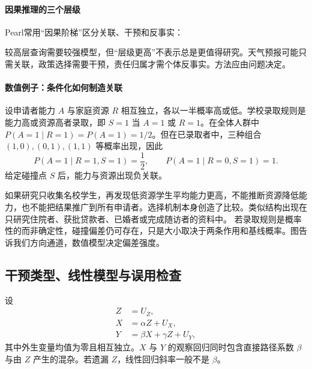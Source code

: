 \paragraph{因果推理的三个层级}

Pearl常用“因果阶梯”区分关联、干预和反事实\parencite{pearlMackenzie2018}：

\begin{center}
\end{center}

较高层查询需要较强模型，但“层级更高”不表示总是更值得研究。天气预报可能只需关联，政策选择需要干预，责任归属才需个体反事实。方法应由问题决定。

\paragraph{数值例子：条件化如何制造关联}

设申请者能力 $A$ 与家庭资源 $R$ 相互独立，各以一半概率高或低。学校录取规则是能力高或资源高者录取，即 $S=1$ 当 $A=1$ 或 $R=1$。在全体人群中 $P(A=1\mid R=1)=P(A=1)=1/2$。但在已录取者中，三种组合 $(1,0),(0,1),(1,1)$ 等概率出现，因此
\[
P(A=1\mid R=1,S=1)=\frac12,
\qquad
P(A=1\mid R=0,S=1)=1.
\]
给定碰撞点 $S$ 后，能力与资源出现负关联。

如果研究只收集名校学生，再发现低资源学生平均能力更高，不能推断资源降低能力，也不能把结果推广到所有申请者。选择机制本身创造了比较。类似结构出现在只研究住院者、获批贷款者、已婚者或完成随访者的资料中。
若录取规则是概率性的而非确定性，碰撞偏差仍可存在，只是大小取决于两条作用和基线概率。图告诉我们方向通道，数值模型决定偏差强度。

\subsection{干预类型、线性模型与误用检查}

设
\begin{align*}
Z&=U_Z,\\
X&=\alpha Z+U_X,\\
Y&=\beta X+\gamma Z+U_Y,
\end{align*}
其中外生变量均值为零且相互独立。$X$ 与 $Y$ 的观察回归同时包含直接路径系数 $\beta$ 与由 $Z$ 产生的混杂。若遗漏 $Z$，线性回归斜率一般不是 $\beta$。


